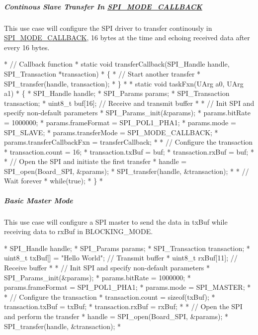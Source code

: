 \subparagraph*{Continous Slave Transfer In \hyperlink{_s_p_i_8h_ab9ea76c6529d6076eee5e1c4a5a92c6fa5631e69925c47a62a261c78ebbda39fb}{S\-P\-I\-\_\-\-M\-O\-D\-E\-\_\-\-C\-A\-L\-L\-B\-A\-C\-K}\label{_s_p_i_c_c26_x_x_d_m_a_8h_USE_CASE_CST}%
\hypertarget{_s_p_i_c_c26_x_x_d_m_a_8h_USE_CASE_CST}{}%
}

This use case will configure the S\-P\-I driver to transfer continously in \hyperlink{_s_p_i_8h_ab9ea76c6529d6076eee5e1c4a5a92c6fa5631e69925c47a62a261c78ebbda39fb}{S\-P\-I\-\_\-\-M\-O\-D\-E\-\_\-\-C\-A\-L\-L\-B\-A\-C\-K}, 16 bytes at the time and echoing received data after every 16 bytes. 
\begin{DoxyCode}
*  \textcolor{comment}{// Callback function}
*  \textcolor{keyword}{static} \textcolor{keywordtype}{void} transferCallback(SPI_Handle handle, SPI_Transaction *transaction)
*  \{
*      \textcolor{comment}{// Start another transfer}
*      SPI_transfer(handle, transaction);
*  \}
*
*  \textcolor{keyword}{static} \textcolor{keywordtype}{void} taskFxn(UArg a0, UArg a1)
*  \{
*      SPI_Handle handle;
*      SPI_Params params;
*      SPI_Transaction transaction;
*      uint8\_t buf[16];                  \textcolor{comment}{// Receive and transmit buffer}
*
*      \textcolor{comment}{// Init SPI and specify non-default parameters}
*      SPI_Params_init(&params);
*      params.bitRate             = 1000000;
*      params.frameFormat         = SPI_POL1_PHA1;
*      params.mode                = SPI_SLAVE;
*      params.transferMode        = SPI_MODE_CALLBACK;
*      params.transferCallbackFxn = transferCallback;
*
*      \textcolor{comment}{// Configure the transaction}
*      transaction.count = 16;
*      transaction.txBuf = buf;
*      transaction.rxBuf = buf;
*
*      \textcolor{comment}{// Open the SPI and initiate the first transfer}
*      handle = SPI_open(Board\_SPI, &params);
*      SPI_transfer(handle, &transaction);
*
*      \textcolor{comment}{// Wait forever}
*      \textcolor{keywordflow}{while}(\textcolor{keyword}{true});
*  \}
*  
\end{DoxyCode}


\subparagraph*{Basic Master Mode}

This use case will configure a S\-P\-I master to send the data in tx\-Buf while receiving data to rx\-Buf in B\-L\-O\-C\-K\-I\-N\-G\-\_\-\-M\-O\-D\-E. 
\begin{DoxyCode}
*  SPI_Handle handle;
*  SPI_Params params;
*  SPI_Transaction transaction;
*  uint8\_t txBuf[] = \textcolor{stringliteral}{"Hello World"};    \textcolor{comment}{// Transmit buffer}
*  uint8\_t rxBuf[11];                  \textcolor{comment}{// Receive buffer}
*
*  \textcolor{comment}{// Init SPI and specify non-default parameters}
*  SPI_Params_init(&params);
*  params.bitRate     = 1000000;
*  params.frameFormat = SPI_POL1_PHA1;
*  params.mode        = SPI_MASTER;
*
*  \textcolor{comment}{// Configure the transaction}
*  transaction.count = \textcolor{keyword}{sizeof}(txBuf);
*  transaction.txBuf = txBuf;
*  transaction.rxBuf = rxBuf;
*
*  \textcolor{comment}{// Open the SPI and perform the transfer}
*  handle = SPI_open(Board\_SPI, &params);
*  SPI_transfer(handle, &transaction);
*  
\end{DoxyCode}


